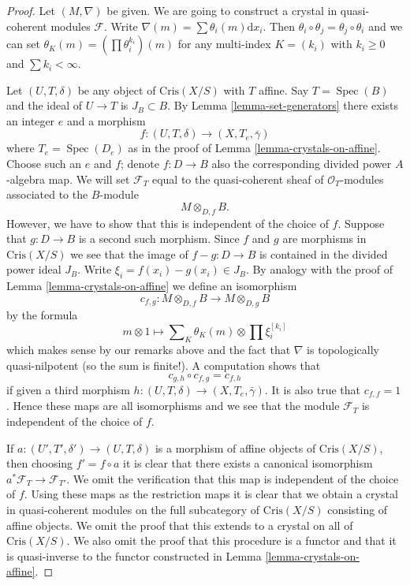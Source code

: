 \documentclass{stacks-project}
\theoremstyle{plain}
\theoremstyle{definition}
\theoremstyle{remark}
\numberwithin{equation}{subsection}
\def\Spec{\mathop{\mathrm{Spec}}}
\begin{document}
\begin{proof}
Let $(M, \nabla)$ be given. We are going to construct
a crystal in quasi-coherent modules $\mathcal{F}$.
Write $\nabla(m) = \sum \theta_i(m)\text{d}x_i$.
Then $\theta_i \circ \theta_j = \theta_j \circ \theta_i$ and we
can set $\theta_K(m) = (\prod \theta_i^{k_i})(m)$ for any multi-index
$K = (k_i)$ with $k_i \geq 0$ and $\sum k_i < \infty$.

\medskip\noindent
Let $(U, T, \delta)$ be any object of $\text{Cris}(X/S)$ with $T$ affine.
Say $T = \Spec(B)$ and the ideal of $U \to T$ is $J_B \subset B$.
By Lemma \ref{lemma-set-generators} there exists an integer $e$ and a morphism
$$
f : (U, T, \delta) \longrightarrow (X, T_e, \bar\gamma)
$$
where $T_e = \Spec(D_e)$ as in the proof of
Lemma \ref{lemma-crystals-on-affine}.
Choose such an $e$ and $f$; denote $f : D \to B$ also the corresponding
divided power $A$-algebra map. We will set $\mathcal{F}_T$ equal to the
quasi-coherent sheaf of $\mathcal{O}_T$-modules associated to the $B$-module
$$
M \otimes_{D, f} B.
$$
However, we have to show that this is independent of the choice of $f$.
Suppose that $g : D \to B$ is a second such morphism. Since $f$ and $g$
are morphisms in $\text{Cris}(X/S)$ we see that the image of
$f - g : D \to B$ is contained in the divided power ideal $J_B$.
Write $\xi_i = f(x_i) - g(x_i) \in J_B$. By analogy with the proof
of Lemma \ref{lemma-crystals-on-affine} we define an isomorphism
$$
c_{f, g} : M \otimes_{D, f} B \longrightarrow M \otimes_{D, g} B
$$
by the formula
$$
m \otimes 1 \longmapsto 
\sum\nolimits_K \theta_K(m) \otimes \prod \xi_i^{[k_i]}
$$
which makes sense by our remarks above and the fact that $\nabla$
is topologically quasi-nilpotent (so the sum is finite!).
A computation shows that
$$
c_{g, h} \circ c_{f, g} = c_{f, h}
$$
if given a third morphism
$h : (U, T, \delta) \longrightarrow (X, T_e, \bar\gamma)$.
It is also true that $c_{f, f} = 1$.
Hence these maps are all isomorphisms and we see that
the module $\mathcal{F}_T$ is independent of the choice of $f$.

\medskip\noindent
If $a : (U', T', \delta') \to (U, T, \delta)$ is a morphism of affine objects
of $\text{Cris}(X/S)$, then choosing $f' = f \circ a$ it is clear
that there exists a canonical isomorphism
$a^*\mathcal{F}_T \to \mathcal{F}_{T'}$. We omit the verification that this
map is independent of the choice of $f$. Using these maps as the restriction
maps it is clear that we obtain a crystal in quasi-coherent modules
on the full subcategory of $\text{Cris}(X/S)$ consisting of affine objects.
We omit the proof that this extends to a crystal on all of
$\text{Cris}(X/S)$. We also omit the proof that this procedure is a functor
and that it is quasi-inverse to the functor constructed in
Lemma \ref{lemma-crystals-on-affine}.
\end{proof}
\end{document}
